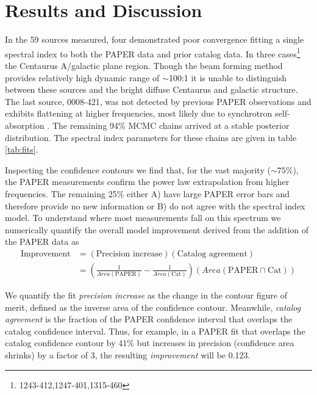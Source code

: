 \documentclass[preprint]{aastex}
\newcommand{\PAPER}{\mathrm{PAPER}}
\begin{document}
\section{Results and Discussion}
\label{sec:fits}


In the 59 sources measured, four demonstrated poor convergence fitting a single
spectral index to both the PAPER data and prior catalog data. In three
cases\footnote{1243-412,1247-401,1315-460} %
the Centaurus A/galactic plane region. Though the beam forming method provides
relatively high dynamic range of $\sim$100:1 it is unable to distinguish
between these sources and the bright diffuse Centaurus and galactic structure.
The last source, 0008-421, was not detected by previous PAPER observations and
exhibits flattening at higher frequencies, most likely due to synchrotron
self-absorption \citep{Jacobs:2011p8438} .  The remaining 94\% MCMC chains
arrived at a stable posterior distribution. The spectral index parameters for
these chains are given in table \ref{tab:fits}.

Inspecting the confidence contours we find that, for the vast majority ($\sim
75$\%), the PAPER measurements confirm the power law extrapolation from higher
frequencies. The remaining 25\% either A) have large PAPER error bars and
therefore provide no new information or B) do not agree with the spectral index
model.  To understand where most measurements fall on this spectrum we
numerically quantify the overall model improvement derived from the addition of
the PAPER data as 
\begin{align}
\textrm{Improvement} &= \left(\textrm{Precision increase}\right) \left(\textrm{Catalog agreement}\right)\\
&= \left(\frac{1}{Area(\textrm{PAPER})} - \frac{1}{Area(\textrm{Cat})}\right) \left( Area(\PAPER \cap \textrm{Cat}) \right)
\end{align}

We quantify the fit {\em precision increase} as the change in the contour
figure of merit, defined as the inverse area of the confidence contour.
Meanwhile, {\em catalog agreement} is the fraction of the PAPER confidence
interval that overlaps the catalog confidence interval.  Thus, for example, in
a PAPER fit that overlaps the catalog confidence contour by 41\% but increases
in precision (confidence area shrinks) by a factor of 3, the resulting {\em
improvement} will be 0.123.  
\end{document}
